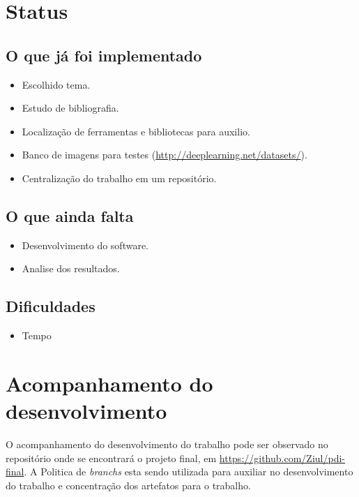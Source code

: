 \documentclass[conference]{IEEEtran}\newcommand{\journal}{false}
\begin{document}
% 
\onecolumn
\maketitle

\section*{Status} %
\label{sec:status}
    

    \subsection*{O que já foi implementado} %
    \label{sub:o_que_já_foi_implementado}

    \begin{itemize}
        \item Escolhido tema.
        \item Estudo de bibliografia.
        \item Localização de ferramentas e bibliotecas para auxilio.
        \item Banco de imagens para testes (\url{http://deeplearning.net/datasets/}).
        \item Centralização do trabalho em um repositório.
    \end{itemize}
    
    \subsection*{O que ainda falta} %
    \label{sub:o_que_ainda_falta}

    \begin{itemize}
        \item Desenvolvimento do software.
        \item Analise dos resultados.
    \end{itemize}
    
    \subsection*{Dificuldades} %
    \label{sub:dificuldades}
    

    \begin{itemize}
        \item Tempo
    \end{itemize}

\section*{Acompanhamento do desenvolvimento} %
\label{sec:acompanhamento_do_desenvolvimento}

    O acompanhamento do desenvolvimento do trabalho pode ser observado no repositório onde se encontrará o projeto final, em \url{https://github.com/Ziul/pdi-final}. A Politica de \textit{branchs} esta sendo utilizada para auxiliar no desenvolvimento do trabalho e concentração dos artefatos para o trabalho.
\end{document}

